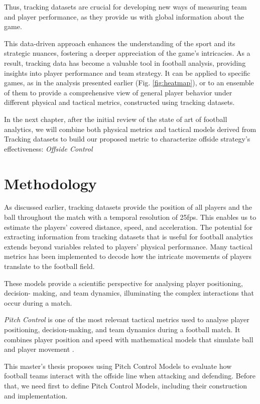 \documentclass[
  10pt,
  twoside,nohyper]{book}
\begin{document}
Thus, tracking datasets are crucial for developing new ways of measuring team and player performance, as they provide us with global information about the game.

This data-driven approach enhances the understanding of the sport and its strategic nuances, fostering a deeper appreciation of the game's intricacies. As a result, tracking data has become a valuable tool in football analysis, providing insights into player performance and team strategy. It can be applied to specific games, as in the analysis presented earlier (Fig. \ref{fig:heatmap}), or to an ensemble of them to provide a comprehensive view of general player behavior under different physical and tactical metrics, constructed using tracking datasets.

In the next chapter, after the initial review of the state of art of football analytics, we will combine both physical metrics and tactical models derived from Tracking datasets to build our proposed metric to characterize offside strategy's effectiveness: \emph{Offside Control}

\chapter{Methodology}\label{methodology}

As discussed earlier, tracking datasets provide the position of all players and the ball throughout the match with a temporal resolution of 25fps. This enables us to estimate the players' covered distance, speed, and acceleration. The potential for extracting information from tracking datasets that is useful for football analytics extends beyond variables related to players' physical performance. Many tactical metrics has been implemented to decode how the intricate movements of players translate to the football field.

These models provide a scientific perspective for analysing player positioning, decision-
making, and team dynamics, illuminating the complex interactions that occur during a
match.

\emph{Pitch Control} is one of the most relevant tactical metrics used to analyse player positioning, decision-making, and team dynamics during a football match. It combines player position and speed with mathematical models that simulate ball and player movement \autocite{Spearman}.

This master's thesis proposes using Pitch Control Models to evaluate how football teams interact with the offside line when attacking and defending. Before that, we need first to define Pitch Control Models, including their construction and implementation.
\end{document}
